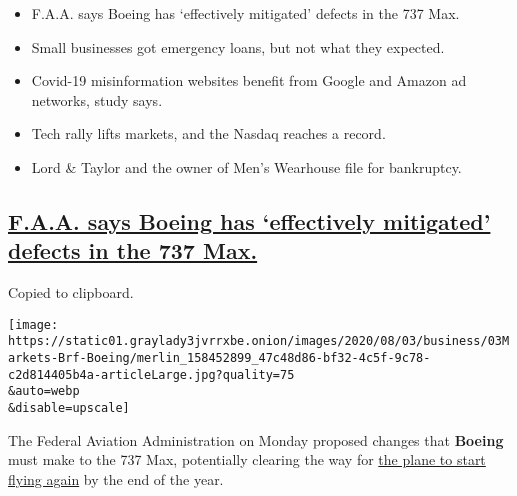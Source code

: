 \begin{itemize}
\item
  \protect\hyperlink{faa-says-boeing-has-effectively-mitigated-defects-in-the-737-max}{}

  F.A.A. says Boeing has `effectively mitigated' defects in the 737 Max.
\item
  \protect\hyperlink{small-businesses-got-emergency-loans-but-not-what-they-expected}{}

  Small businesses got emergency loans, but not what they expected.
\item
  \protect\hyperlink{covid-19-misinformation-websites-benefit-from-google-and-amazon-ad-networks-study-says}{}

  Covid-19 misinformation websites benefit from Google and Amazon ad
  networks, study says.
\item
  \protect\hyperlink{tech-rally-lifts-markets-and-the-nasdaq-reaches-a-record}{}

  Tech rally lifts markets, and the Nasdaq reaches a record.
\item
  \protect\hyperlink{lord-taylor-and-the-owner-of-mens-wearhouse-file-for-bankruptcy}{}

  Lord \& Taylor and the owner of Men's Wearhouse file for bankruptcy.
\end{itemize}

\hypertarget{faa-says-boeing-has-effectively-mitigated-defects-in-the-737-max}{%
\subsection{\texorpdfstring{\protect\hyperlink{faa-says-boeing-has-effectively-mitigated-defects-in-the-737-max}{F.A.A.
says Boeing has `effectively mitigated' defects in the 737
Max.}}{F.A.A. says Boeing has `effectively mitigated' defects in the 737 Max.}}\label{faa-says-boeing-has-effectively-mitigated-defects-in-the-737-max}}

Copied to clipboard.

\texttt{[image: https://static01.graylady3jvrrxbe.onion/images/2020/08/03/business/03Markets-Brf-Boeing/merlin\_158452899\_47c48d86-bf32-4c5f-9c78-c2d814405b4a-articleLarge.jpg?quality=75\\\&auto=webp\\\&disable=upscale]}

The Federal Aviation Administration on Monday proposed changes that
\textbf{Boeing} must make to the 737 Max, potentially clearing the way
for
\href{https://www.nytimes3xbfgragh.onion/2020/07/15/business/boeing-737-max-return.html}{the
plane to start flying again} by the end of the year.

